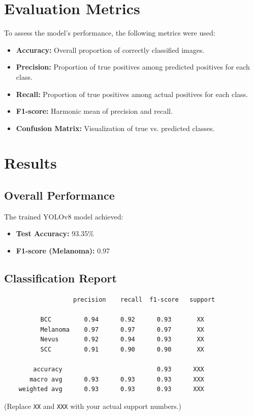 \documentclass[a4paper,12pt]{report}
\begin{document}
\begin{spacing}{1.5}
    \section{Evaluation Metrics}
    To assess the model's performance, the following metrics were used:
    \begin{itemize}
        \item \textbf{Accuracy:} Overall proportion of correctly classified images.
        \item \textbf{Precision:} Proportion of true positives among predicted positives for each class.
        \item \textbf{Recall:} Proportion of true positives among actual positives for each class.
        \item \textbf{F1-score:} Harmonic mean of precision and recall.
        \item \textbf{Confusion Matrix:} Visualization of true vs. predicted classes.
    \end{itemize}
    
    \section{Results}
    
    \subsection*{Overall Performance}
    The trained YOLOv8 model achieved:
    \begin{itemize}
        \item \textbf{Test Accuracy:} 93.35\%
        \item \textbf{F1-score (Melanoma):} 0.97
    \end{itemize}
    
    \subsection*{Classification Report}
    \begin{verbatim}
                   precision    recall  f1-score   support
    
          BCC         0.94      0.92      0.93       XX
          Melanoma    0.97      0.97      0.97       XX
          Nevus       0.92      0.94      0.93       XX
          SCC         0.91      0.90      0.90       XX
    
        accuracy                          0.93      XXX
       macro avg      0.93      0.93      0.93      XXX
    weighted avg      0.93      0.93      0.93      XXX
    \end{verbatim}
    (Replace \texttt{XX} and \texttt{XXX} with your actual support numbers.)


\end{spacing}
\end{document}
